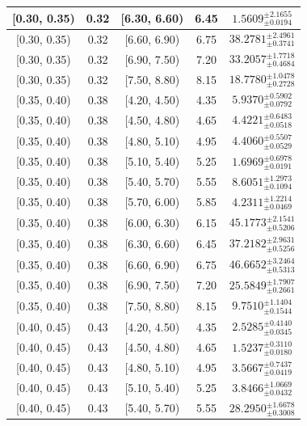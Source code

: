 \begin{longtable}{|c|c|c|c|c|}
\hline
[0.30, 0.35) & 0.32 & [6.30, 6.60) & 6.45 & $1.5609^{ \pm 2.1655 }_{ \pm 0.0194 }$ \\ 
\hline
[0.30, 0.35) & 0.32 & [6.60, 6.90) & 6.75 & $38.2781^{ \pm 2.4961 }_{ \pm 0.3741 }$ \\ 
\hline
[0.30, 0.35) & 0.32 & [6.90, 7.50) & 7.20 & $33.2057^{ \pm 1.7718 }_{ \pm 0.4684 }$ \\ 
\hline
[0.30, 0.35) & 0.32 & [7.50, 8.80) & 8.15 & $18.7780^{ \pm 1.0478 }_{ \pm 0.2728 }$ \\ 
\hline
[0.35, 0.40) & 0.38 & [4.20, 4.50) & 4.35 & $5.9370^{ \pm 0.5902 }_{ \pm 0.0792 }$ \\ 
\hline
[0.35, 0.40) & 0.38 & [4.50, 4.80) & 4.65 & $4.4221^{ \pm 0.6483 }_{ \pm 0.0518 }$ \\ 
\hline
[0.35, 0.40) & 0.38 & [4.80, 5.10) & 4.95 & $4.4060^{ \pm 0.5507 }_{ \pm 0.0529 }$ \\ 
\hline
[0.35, 0.40) & 0.38 & [5.10, 5.40) & 5.25 & $1.6969^{ \pm 0.6978 }_{ \pm 0.0191 }$ \\ 
\hline
[0.35, 0.40) & 0.38 & [5.40, 5.70) & 5.55 & $8.6051^{ \pm 1.2973 }_{ \pm 0.1094 }$ \\ 
\hline
[0.35, 0.40) & 0.38 & [5.70, 6.00) & 5.85 & $4.2311^{ \pm 1.2214 }_{ \pm 0.0469 }$ \\ 
\hline
[0.35, 0.40) & 0.38 & [6.00, 6.30) & 6.15 & $45.1773^{ \pm 2.1541 }_{ \pm 0.5206 }$ \\ 
\hline
[0.35, 0.40) & 0.38 & [6.30, 6.60) & 6.45 & $37.2182^{ \pm 2.9631 }_{ \pm 0.5256 }$ \\ 
\hline
[0.35, 0.40) & 0.38 & [6.60, 6.90) & 6.75 & $46.6652^{ \pm 3.2464 }_{ \pm 0.5313 }$ \\ 
\hline
[0.35, 0.40) & 0.38 & [6.90, 7.50) & 7.20 & $25.5849^{ \pm 1.7907 }_{ \pm 0.2661 }$ \\ 
\hline
[0.35, 0.40) & 0.38 & [7.50, 8.80) & 8.15 & $9.7510^{ \pm 1.1404 }_{ \pm 0.1544 }$ \\ 
\hline
[0.40, 0.45) & 0.43 & [4.20, 4.50) & 4.35 & $2.5285^{ \pm 0.4140 }_{ \pm 0.0345 }$ \\ 
\hline
[0.40, 0.45) & 0.43 & [4.50, 4.80) & 4.65 & $1.5237^{ \pm 0.3110 }_{ \pm 0.0180 }$ \\ 
\hline
[0.40, 0.45) & 0.43 & [4.80, 5.10) & 4.95 & $3.5667^{ \pm 0.7437 }_{ \pm 0.0419 }$ \\ 
\hline
[0.40, 0.45) & 0.43 & [5.10, 5.40) & 5.25 & $3.8466^{ \pm 1.0669 }_{ \pm 0.0432 }$ \\ 
\hline
[0.40, 0.45) & 0.43 & [5.40, 5.70) & 5.55 & $28.2950^{ \pm 1.6678 }_{ \pm 0.3008 }$ \\ 

\end{longtable}
